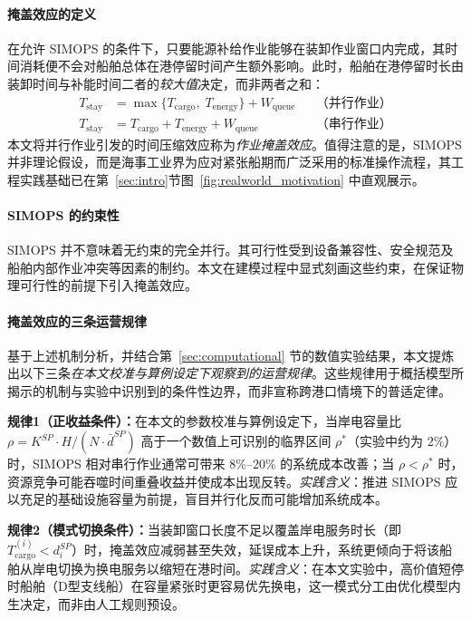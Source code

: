 \documentclass[UTF8, a4paper, 12pt]{ctexart}
\theoremstyle{plain}
\theoremstyle{definition}
\theoremstyle{remark}
\begin{document}
\paragraph{掩盖效应的定义}
在允许 SIMOPS 的条件下，只要能源补给作业能够在装卸作业窗口内完成，其时间消耗便不会对船舶总体在港停留时间产生额外影响。此时，船舶在港停留时长由装卸时间与补能时间二者的\emph{较大值}决定，而非两者之和：
\begin{equation*}
\begin{aligned}
T_{\text{stay}} &= \max\{T_{\text{cargo}},\; T_{\text{energy}}\} + W_{\text{queue}}
&& \text{（并行作业）} \\
T_{\text{stay}} &= T_{\text{cargo}} + T_{\text{energy}} + W_{\text{queue}}
&& \text{（串行作业）}
\end{aligned}
\end{equation*}
本文将并行作业引发的时间压缩效应称为\emph{作业掩盖效应}。值得注意的是，SIMOPS 并非理论假设，而是海事工业界为应对紧张船期而广泛采用的标准操作流程，其工程实践基础已在第~\ref{sec:intro}节图~\ref{fig:realworld_motivation} 中直观展示。
 
\paragraph{SIMOPS 的约束性}
SIMOPS 并不意味着无约束的完全并行。其可行性受到设备兼容性、安全规范及船舶内部作业冲突等因素的制约。本文在建模过程中显式刻画这些约束，在保证物理可行性的前提下引入掩盖效应。

\paragraph{掩盖效应的三条运营规律}
基于上述机制分析，并结合第~\ref{sec:computational} 节的数值实验结果，本文提炼出以下三条\emph{在本文校准与算例设定下观察到的运营规律}。这些规律用于概括模型所揭示的机制与实验中识别到的条件性边界，而非宣称跨港口情境下的普适定律。

\textbf{规律1（正收益条件）：}在本文的参数校准与算例设定下，当岸电容量比 $\rho = K^{SP} \cdot H / (N \cdot \bar{d}^{SP})$ 高于一个数值上可识别的临界区间 $\rho^*$（实验中约为 $2\%$）时，SIMOPS 相对串行作业通常可带来 $8\%$--$20\%$ 的系统成本改善；当 $\rho < \rho^*$ 时，资源竞争可能吞噬时间重叠收益并使成本出现反转。\emph{实践含义}：推进 SIMOPS 应以充足的基础设施容量为前提，盲目并行化反而可能增加系统成本。

\textbf{规律2（模式切换条件）：}当装卸窗口长度不足以覆盖岸电服务时长（即 $T^{(i)}_{\text{cargo}} < d_i^{SP}$）时，掩盖效应减弱甚至失效，延误成本上升，系统更倾向于将该船舶从岸电切换为换电服务以缩短在港时间。\emph{实践含义}：在本文实验中，高价值短停时船舶（D型支线船）在容量紧张时更容易优先换电，这一模式分工由优化模型内生决定，而非由人工规则预设。
\end{document}
